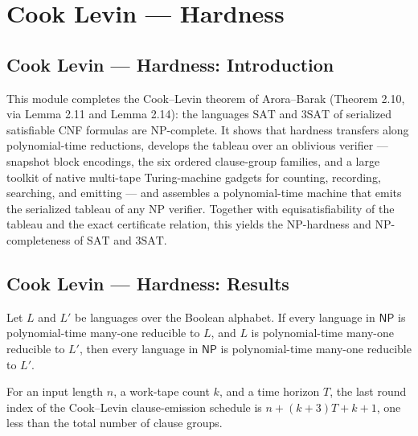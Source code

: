 \section{Cook Levin --- Hardness}
\subsection*{Cook Levin --- Hardness: Introduction}

This module completes the Cook--Levin theorem of Arora--Barak (Theorem 2.10,
via Lemma 2.11 and Lemma 2.14): the languages $\mathrm{SAT}$ and $\mathrm{3SAT}$
of serialized satisfiable CNF formulas are $\mathrm{NP}$-complete. It shows that
hardness transfers along polynomial-time reductions, develops the tableau over an
oblivious verifier --- snapshot block encodings, the six ordered clause-group
families, and a large toolkit of native multi-tape Turing-machine gadgets for
counting, recording, searching, and emitting --- and assembles a polynomial-time
machine that emits the serialized tableau of any $\mathrm{NP}$ verifier. Together
with equisatisfiability of the tableau and the exact certificate relation, this
yields the $\mathrm{NP}$-hardness and $\mathrm{NP}$-completeness of
$\mathrm{SAT}$ and $\mathrm{3SAT}$.

\subsection*{Cook Levin --- Hardness: Results}

\begin{theorem}
\label{Complexity.NPHard.polyTimeReducible}
\leanok
{}
Let $L$ and $L'$ be languages over the Boolean alphabet. If every language in
$\mathsf{NP}$ is polynomial-time many-one reducible to $L$, and $L$ is polynomial-time
many-one reducible to $L'$, then every language in $\mathsf{NP}$ is polynomial-time
many-one reducible to $L'$.
\end{theorem}

\begin{definition}
\label{Complexity.clLastRound}
\leanok
For an input length $n$, a work-tape count $k$, and a time horizon $T$, the last round index of the Cook--Levin clause-emission schedule is $n + (k+3)T + k + 1$, one less than the total number of clause groups.
\end{definition}

